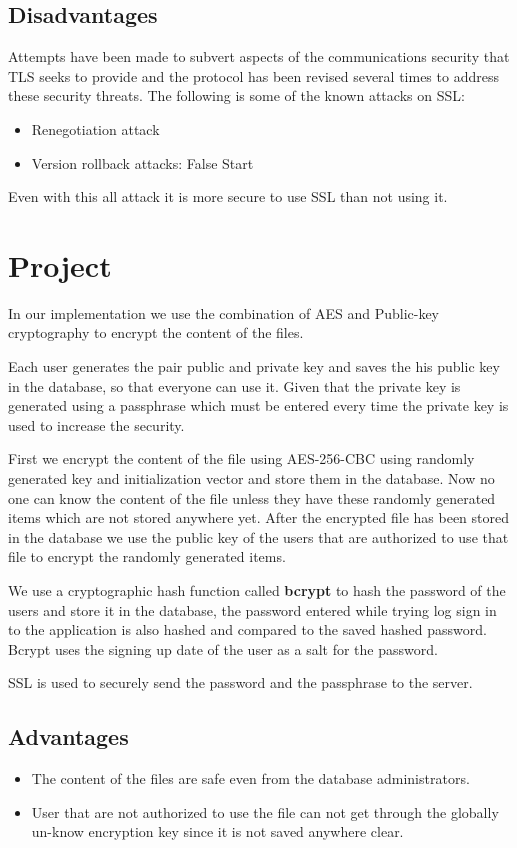 \subsection{Disadvantages}
Attempts have been made to subvert aspects of the communications security that TLS seeks to provide and the protocol has been revised several times to address these security threats. The following is some of the known attacks on SSL:
\begin{itemize}
	\item Renegotiation attack
	\item Version rollback attacks: False Start
\end{itemize}
Even with this all attack it is more secure to use SSL than not using it.

\section{Project}
\par In our implementation we use the combination of AES and Public-key cryptography to encrypt the content of the files.
\par Each user generates the pair public and private key and saves the his public key in the database, so that everyone can use it. Given that the private key is generated using a passphrase which must be entered every time the private key is used to increase the security.
\par First we encrypt the content of the file using AES-256-CBC using randomly generated key and initialization vector and store them in the database. Now no one can know the content of the file unless they have these randomly generated items which are not stored anywhere yet. After the encrypted file has been stored in the database we use the public key of the users that are authorized to use that file to encrypt the randomly generated items.
\par We use a cryptographic hash function called \textbf{bcrypt} to hash the password of the users and store it in the database, the password entered while trying log sign in to the application is also hashed and compared to the saved hashed password. Bcrypt uses the signing up date of the user as a salt for the password.
\par SSL is used to securely send the password and the passphrase to the server.
\subsection{Advantages}
\begin{itemize}
	\item The content of the files are safe even from the database administrators.
	\item User that are not authorized to use the file can not get through the globally un-know encryption key since it is not saved anywhere clear.
\end{itemize}
